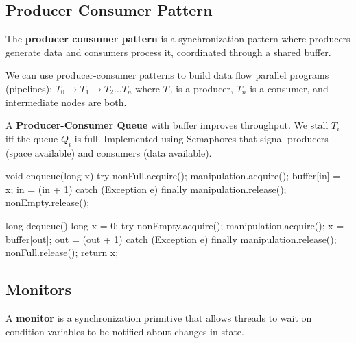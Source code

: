 \subsection{Producer Consumer Pattern}

\begin{definition}
The \textbf{producer consumer pattern} is a synchronization pattern where producers generate data and consumers process it, coordinated through a shared buffer.
\end{definition}

\begin{remark}
We can use producer-consumer patterns to build data flow parallel programs (pipelines):
$T_0 \rightarrow T_1 \rightarrow T_2 \dots T_n$
where $T_0$ is a producer, $T_n$ is a consumer, and intermediate nodes are both.
\end{remark}

\begin{remark}
A \textbf{Producer-Consumer Queue} with buffer improves throughput. We stall $T_i$ iff the queue $Q_i$ is full. Implemented using Semaphores that signal producers (space available) and consumers (data available).
\end{remark}

\begin{codeexample}
void enqueue(long x) {
    try {
        nonFull.acquire();
        manipulation.acquire();
        buffer[in] = x;
        in = (in + 1) %
    } catch (Exception e) {}
    finally {
        manipulation.release();
        nonEmpty.release();
    }
}
\end{codeexample}

\begin{codeexample}
long dequeue() {
    long x = 0;
    try {
        nonEmpty.acquire();
        manipulation.acquire();
        x = buffer[out];
        out = (out + 1) %
    } catch (Exception e) {}
    finally {
        manipulation.release();
        nonFull.release();
    }
    return x;
}
\end{codeexample}

\subsection{Monitors}

\begin{definition}
A \textbf{monitor} is a synchronization primitive that allows threads to wait on condition variables to be notified about changes in state.
\end{definition}

